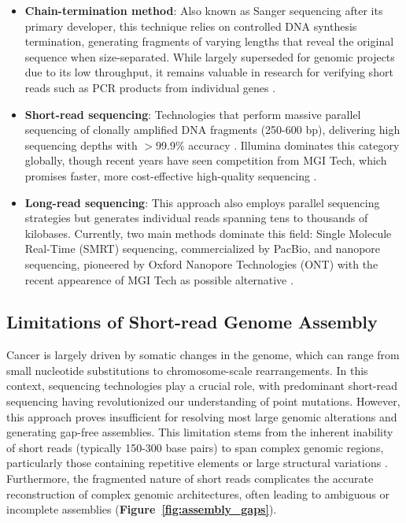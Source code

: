 \begin{itemize}[label=\tiny\raise.5ex\hbox{•}, leftmargin=\parindent]
    
    \item \textbf{Chain-termination method}: Also known as Sanger sequencing 
    after its primary developer, this technique relies on controlled DNA synthesis 
    termination, generating fragments of varying lengths that reveal the original 
    sequence when size-separated. While largely superseded for genomic projects 
    due to its low throughput, it remains valuable in research for verifying 
    short reads such as PCR products from individual genes 
    \cite{moorcraft_understanding_2015}.

    \item \textbf{Short-read sequencing}: Technologies that perform massive 
    parallel sequencing of clonally amplified DNA fragments (250-600 bp), 
    delivering high sequencing depths with $>$99.9\% accuracy
    \cite{logsdon_long-read_2020}. Illumina dominates this category globally, 
    though recent years have seen competition from MGI Tech, which promises 
    faster, more cost-effective high-quality sequencing
    \cite{jeon_comparison_2021}.

    \item \textbf{Long-read sequencing}: This approach also employs parallel 
    sequencing strategies but generates individual reads spanning tens to 
    thousands of kilobases. Currently, two main methods dominate this field: 
    Single Molecule Real-Time (SMRT) sequencing, commercialized by PacBio, and 
    nanopore sequencing, pioneered by Oxford Nanopore Technologies (ONT) 
    \cite{logsdon_long-read_2020} with the recent appearence of MGI Tech as
    possible alternative \cite{zhang_single-molecule_2024}.

\end{itemize}

\subsection{Limitations of Short-read Genome Assembly}

Cancer is largely driven by somatic changes in the genome, which can range from 
small nucleotide substitutions to chromosome-scale rearrangements. In this context, 
sequencing technologies play a crucial role, with predominant short-read sequencing 
having revolutionized our understanding of point mutations. However, this 
approach proves insufficient for resolving most large genomic alterations and 
generating gap-free assemblies. This limitation stems from the inherent 
inability of short reads (typically 150-300 base pairs) to span complex genomic 
regions, particularly those containing repetitive elements or large structural 
variations \cite{ho_structural_2020}. Furthermore, the fragmented nature of short 
reads complicates the accurate reconstruction of complex genomic architectures, 
often leading to ambiguous or incomplete assemblies 
(\textbf{Figure~\ref{fig:assembly_gaps}}).

